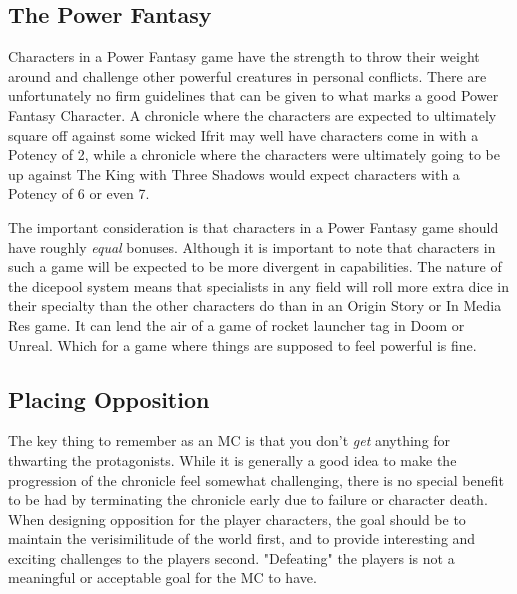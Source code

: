 \subsection[Power Fantasy]{The Power Fantasy}

Characters in a Power Fantasy game have the strength to throw their weight around and challenge other powerful creatures in personal conflicts. There are unfortunately no firm guidelines that can be given to what marks a good Power Fantasy Character. A chronicle where the characters are expected to ultimately square off against some wicked Ifrit may well have characters come in with a Potency of 2, while a chronicle where the characters were ultimately going to be up against The King with Three Shadows would expect characters with a Potency of 6 or even 7.

The important consideration is that characters in a Power Fantasy game should have roughly \textit{equal} bonuses. Although it is important to note that characters in such a game will be expected to be more divergent in capabilities. The nature of the dicepool system means that specialists in any field will roll more extra dice in their specialty than the other characters do than in an Origin Story or In Media Res game. It can lend the air of a game of rocket launcher tag in Doom or Unreal. Which for a game where things are supposed to feel powerful is fine.

\subsection{Placing Opposition}

The key thing to remember as an MC is that you don't \textit{get} anything for thwarting the protagonists. While it is generally a good idea to make the progression of the chronicle feel somewhat challenging, there is no special benefit to be had by terminating the chronicle early due to failure or character death. When designing opposition for the player characters, the goal should be to maintain the verisimilitude of the world first, and to provide interesting and exciting challenges to the players second. "Defeating" the players is not a meaningful or acceptable goal for the MC to have.


